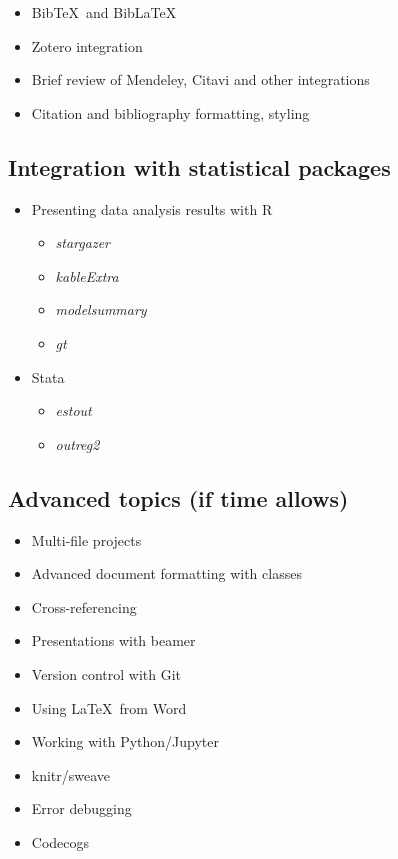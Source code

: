 \documentclass[a4paper,12pt]{article}
\begin{document}
\begin{itemize}
    \item Bib\TeX \ and Bib\LaTeX
    \item Zotero integration
    \item Brief review of Mendeley, Citavi and other integrations
    \item Citation and bibliography formatting, styling
\end{itemize}

\subsection{Integration with statistical packages}

\begin{itemize}
    \item Presenting data analysis results with R
    \begin{itemize}
        \item \textit{stargazer}
        \item \textit{kableExtra}
        \item \textit{modelsummary}
        \item \textit{gt}
    \end{itemize}
    \item Stata
    \begin{itemize}
        \item \textit{estout}
        \item \textit{outreg2}
    \end{itemize}
\end{itemize}

\subsection{Advanced topics (if time allows)}

\begin{itemize}
    \item Multi-file projects
    \item Advanced document formatting with classes
    \item Cross-referencing
    \item Presentations with beamer
    \item Version control with Git
    \item Using \LaTeX \ from Word
    \item Working with Python/Jupyter
    \item knitr/sweave
    \item Error debugging
    \item Codecogs
\end{itemize}

\renewcommand\bibname{Reference Material}
\printbibliography
\end{document}
